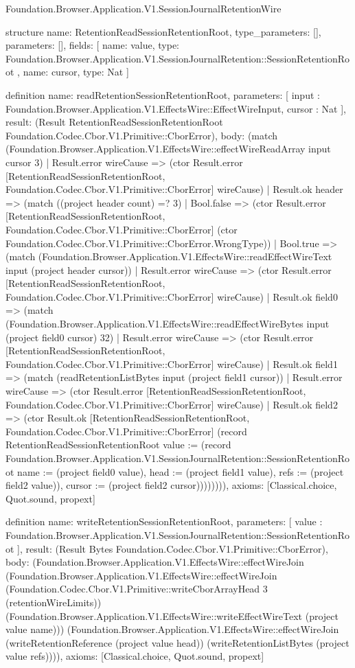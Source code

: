 \begin{lexlean}{Foundation.Browser.Application.V1.SessionJournalRetentionWire}
\begin{semanticmodule}
structure{
  name: RetentionReadSessionRetentionRoot,
  type_parameters: [],
  parameters: [],
  fields: [
    {
      name: value,
      type: Foundation.Browser.Application.V1.SessionJournalRetention::SessionRetentionRoot
    },
    {name: cursor, type: Nat}
  ]
}

definition{
  name: readRetentionSessionRetentionRoot,
  parameters: [
    input : Foundation.Browser.Application.V1.EffectsWire::EffectWireInput,
    cursor : Nat
  ],
  result: (Result RetentionReadSessionRetentionRoot Foundation.Codec.Cbor.V1.Primitive::CborError),
  body: (match (Foundation.Browser.Application.V1.EffectsWire::effectWireReadArray input cursor 3)
    | Result.error wireCause => (ctor Result.error [RetentionReadSessionRetentionRoot, Foundation.Codec.Cbor.V1.Primitive::CborError] wireCause)
    | Result.ok header => (match ((project header count) =? 3)
      | Bool.false => (ctor Result.error [RetentionReadSessionRetentionRoot, Foundation.Codec.Cbor.V1.Primitive::CborError] (ctor Foundation.Codec.Cbor.V1.Primitive::CborError.WrongType))
      | Bool.true => (match (Foundation.Browser.Application.V1.EffectsWire::readEffectWireText input (project header cursor))
        | Result.error wireCause => (ctor Result.error [RetentionReadSessionRetentionRoot, Foundation.Codec.Cbor.V1.Primitive::CborError] wireCause)
        | Result.ok field0 => (match (Foundation.Browser.Application.V1.EffectsWire::readEffectWireBytes input (project field0 cursor) 32)
          | Result.error wireCause => (ctor Result.error [RetentionReadSessionRetentionRoot, Foundation.Codec.Cbor.V1.Primitive::CborError] wireCause)
          | Result.ok field1 => (match (readRetentionListBytes input (project field1 cursor))
            | Result.error wireCause => (ctor Result.error [RetentionReadSessionRetentionRoot, Foundation.Codec.Cbor.V1.Primitive::CborError] wireCause)
            | Result.ok field2 => (ctor Result.ok [RetentionReadSessionRetentionRoot, Foundation.Codec.Cbor.V1.Primitive::CborError] (record RetentionReadSessionRetentionRoot {value := (record Foundation.Browser.Application.V1.SessionJournalRetention::SessionRetentionRoot {name := (project field0 value), head := (project field1 value), refs := (project field2 value)}), cursor := (project field2 cursor)}))))))),
  axioms: [Classical.choice, Quot.sound, propext]
}

definition{
  name: writeRetentionSessionRetentionRoot,
  parameters: [
    value : Foundation.Browser.Application.V1.SessionJournalRetention::SessionRetentionRoot
  ],
  result: (Result Bytes Foundation.Codec.Cbor.V1.Primitive::CborError),
  body: (Foundation.Browser.Application.V1.EffectsWire::effectWireJoin (Foundation.Browser.Application.V1.EffectsWire::effectWireJoin (Foundation.Codec.Cbor.V1.Primitive::writeCborArrayHead 3 (retentionWireLimits)) (Foundation.Browser.Application.V1.EffectsWire::writeEffectWireText (project value name))) (Foundation.Browser.Application.V1.EffectsWire::effectWireJoin (writeRetentionReference (project value head)) (writeRetentionListBytes (project value refs)))),
  axioms: [Classical.choice, Quot.sound, propext]
}


\end{semanticmodule}
\end{lexlean}
